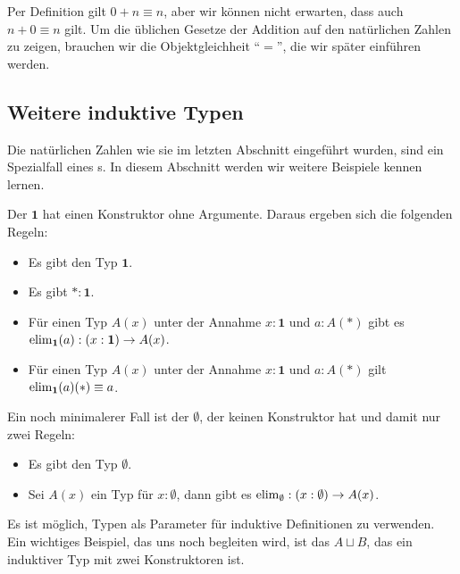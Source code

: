 \begin{bemerkung}
  Per Definition gilt $0+n\equiv n$, aber wir können nicht erwarten, dass auch $n+0\equiv n$ gilt.
  Um die üblichen Gesetze der Addition auf den natürlichen Zahlen zu zeigen, brauchen wir die Objektgleichheit ``$=$'', die wir später einführen werden.
\end{bemerkung}

\subsection{Weitere induktive Typen}
Die natürlichen Zahlen wie sie im letzten Abschnitt eingeführt wurden, sind ein Spezialfall eines
s. In diesem Abschnitt werden wir weitere Beispiele kennen lernen.

Der  $\mathbf{1}$ hat einen Konstruktor ohne Argumente.
Daraus ergeben sich die folgenden Regeln:

\begin{regeln}
\begin{itemize}
\item Es gibt den Typ $\mathbf{1}$. 
\item Es gibt $\ast:\mathbf{1}$. 
\item Für einen Typ $A(x)$ unter der Annahme $x:\mathbf{1}$ und $a:A(\ast)$
gibt es $\mathrm{elim}_{\mathbf{1}}(a):(x:\mathbf{1})\to A(x)$.
\item Für einen Typ $A(x)$ unter der Annahme $x:\mathbf{1}$ und $a:A(\ast)$
gilt $\mathrm{elim}_{\mathbf{1}}(a)(\ast)\equiv a$.
\end{itemize}
\end{regeln}

Ein noch minimalerer Fall ist der  $\emptyset$\index{$\emptyset$},
der keinen Konstruktor hat und damit nur zwei Regeln:

\begin{regeln}
\begin{itemize}
\item Es gibt den Typ $\emptyset$. 
\item Sei $A(x)$ ein Typ für $x:\emptyset$, dann gibt es $\mathrm{elim}_\emptyset:(x:\emptyset)\to A(x)$.
\end{itemize}
\end{regeln}

Es ist möglich, Typen als Parameter für induktive Definitionen zu verwenden.
Ein wichtiges Beispiel, das uns noch begleiten wird, ist das  $A\sqcup B$, das ein induktiver Typ mit zwei Konstruktoren ist.


